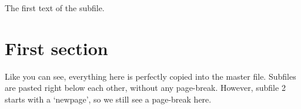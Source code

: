 \documentclass[thesis]{subfiles}
\begin{document}
The first text of the subfile.

\section{First section}


Like you can see, everything here is perfectly copied into the master file.\bigbreak
Subfiles are pasted right below each other, without any page-break. However, subfile 2 starts with a `newpage', so we still see a page-break here.
\end{document}
